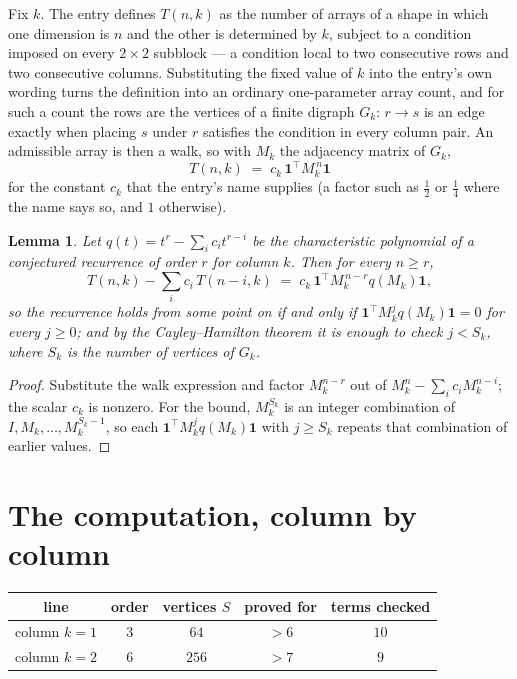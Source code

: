 \documentclass[11pt,a4paper]{article}
\theoremstyle{plain}
\newtheorem{lemma}[theorem]{Lemma}
\theoremstyle{definition}
\begin{document}
Fix $k$. The entry defines $T(n,k)$ as the number of arrays of a shape in which one dimension
is $n$ and the other is determined by $k$, subject to a condition imposed on every
$2\times2$ subblock --- a condition local to two consecutive rows and two consecutive columns.
Substituting the fixed value of $k$ into the entry's own wording turns the definition into an
ordinary one-parameter array count, and for such a count the rows are the vertices of a finite
digraph $G_k$: $r\to s$ is an edge exactly when placing $s$ under $r$ satisfies the condition
in every column pair. An admissible array is then a walk, so with $M_k$ the adjacency matrix
of $G_k$,
\[
T(n,k)\;=\;c_k\,\mathbf{1}^{\!\top}M_k^{\,n}\mathbf{1}
\]
for the constant $c_k$ that the entry's name supplies (a factor such as $\tfrac12$ or
$\tfrac14$ where the name says so, and $1$ otherwise).

\begin{lemma}\label{lem:crit}
Let $q(t)=t^{r}-\sum_i c_it^{r-i}$ be the characteristic polynomial of a conjectured
recurrence of order $r$ for column $k$. Then for every $n\ge r$,
\[
T(n,k)-\sum_i c_i\,T(n-i,k)\;=\;c_k\,\mathbf{1}^{\!\top}M_k^{\,n-r}q(M_k)\mathbf{1},
\]
so the recurrence holds from some point on if and only if
$\mathbf{1}^{\!\top}M_k^{j}q(M_k)\mathbf{1}=0$ for every $j\ge0$; and by the
Cayley--Hamilton theorem it is enough to check $j<S_k$, where $S_k$ is the number of vertices
of $G_k$.
\end{lemma}

\begin{proof}
Substitute the walk expression and factor $M_k^{n-r}$ out of $M_k^{n}-\sum_ic_iM_k^{n-i}$;
the scalar $c_k$ is nonzero. For the bound, $M_k^{S_k}$ is an integer combination of
$I,M_k,\dots,M_k^{S_k-1}$, so each $\mathbf{1}^{\!\top}M_k^{j}q(M_k)\mathbf{1}$ with
$j\ge S_k$ repeats that combination of earlier values.
\end{proof}

\section{The computation, column by column}

\begin{center}
\begin{tabular}{ccccc}
line & order & vertices $S$ & proved for & terms checked \\ \hline
column $k$$=1$ & $3$ & $64$ & $>6$ & $10$ \\
column $k$$=2$ & $6$ & $256$ & $>7$ & $9$ \\
\end{tabular}
\end{center}
\end{document}

